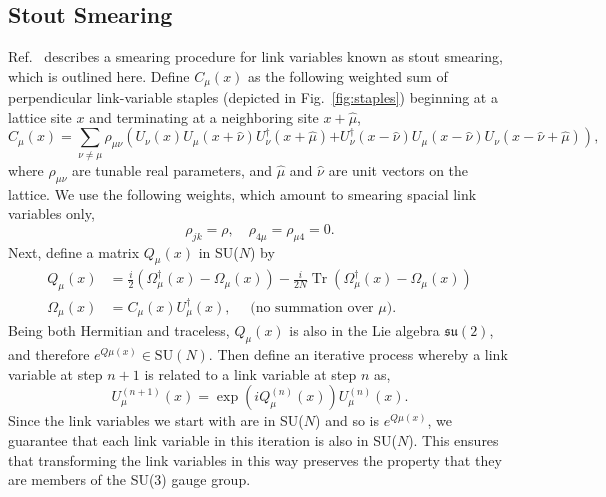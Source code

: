     \subsection{Stout Smearing}
    Ref.~\cite{PhysRevD.69.054501} describes a smearing procedure for link variables known as stout smearing, which is outlined here. Define $C_\mu(x)$ as the following weighted sum of perpendicular link-variable staples (depicted in Fig.~\ref{fig:staples}) beginning at a lattice site $x$ and terminating at a neighboring site $x + \hat\mu$,
    \begin{equation}
        C_{\mu}(x)= \sum_{\nu \neq \mu} \rho_{\mu \nu}\left(U_{\nu}(x) U_{\mu}(x+\hat{\nu}) U_{\nu}^{\dagger}(x+\hat{\mu})\right.\left.+U_{\nu}^{\dagger}(x-\hat{\nu}) U_{\mu}(x-\hat{\nu}) U_{\nu}(x-\hat{\nu}+\hat{\mu})\right),
    \end{equation}
    where $\rho_{\mu\nu}$ are tunable real parameters, and $\hat\mu$ and $\hat\nu$ are unit vectors on the lattice. We use the following weights, which amount to smearing spacial link variables only,
    \begin{equation}
        \rho_{j k}=\rho, \quad \rho_{4 \mu}=\rho_{\mu 4}=0.
    \end{equation}
    Next, define a matrix $Q_\mu(x)$ in SU($N$) by
    \begin{equation}
        \begin{aligned}
            Q_{\mu}(x)&=\frac{i}{2}\left(\Omega_{\mu}^{\dagger}(x)-\Omega_{\mu}(x)\right)-\frac{i}{2 N} \operatorname{Tr}\left(\Omega_{\mu}^{\dagger}(x)-\Omega_{\mu}(x)\right) \\
            \Omega_{\mu}(x)&=C_{\mu}(x) U_{\mu}^{\dagger}(x), \quad \text { (no summation over } \mu).
        \end{aligned}
    \end{equation}
    Being both Hermitian and traceless, $Q_\mu(x)$ is also in the Lie algebra $\mathfrak{su}(2)$, and therefore $e^{Q\mu(x)} \in \mathrm{SU}(N)$. Then define an iterative process whereby a link variable at step $n + 1$ is related to a link variable at step $n$ as,
    \begin{equation}
        U_{\mu}^{(n+1)}(x)=\exp \left(i Q_{\mu}^{(n)}(x)\right) U_{\mu}^{(n)}(x).
    \end{equation}
    Since the link variables we start with are in SU($N$) and so is $e^{Q\mu(x)}$, we guarantee that each link variable in this iteration is also in SU($N$). This ensures that transforming the link variables in this way preserves the property that they are members of the SU(3) gauge group.

